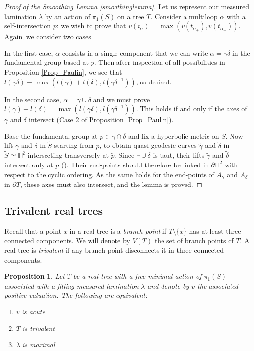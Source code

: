 \documentclass{amsart}
\newtheorem{proposition}{Proposition}
\renewcommand{\H}{\mathbb{H}}
\begin{document}
\begin{proof}[Proof of the Smoothing Lemma \ref{smoothinglemma}]
Let us represent our measured lamination $\lambda$ by an action of $\pi_1(S)$ on a tree $T$. Consider a multiloop $\alpha$ with a self-intersection $p$: we wish to prove that $v(t_\alpha)=\max(v(t_{\alpha_+}),v(t_{\alpha_-}))$. Again, we consider two cases.

In the first case, $\alpha$ consists in a single component that we can write $\alpha=\gamma\delta$ in the fundamental group based at $p$. Then after inspection of all possibilities in Proposition \ref{Prop_Paulin}, we see that $l(\gamma\delta)=\max(l(\gamma)+l(\delta),l(\gamma\delta^{-1}))$, as desired.

In the second case, $\alpha=\gamma\cup\delta$ and we must prove $l(\gamma)+l(\delta)=\max(l(\gamma\delta),l(\gamma\delta^{-1}))$. This holds if and only if the axes of $\gamma$ and $\delta$ intersect (Case 2 of Proposition \ref{Prop_Paulin}). 

Base the fundamental group at $p\in \gamma\cap \delta$ and fix a hyperbolic metric on $S$. Now lift $\gamma$ and $\delta$ in $\tilde{S}$ starting from $p$, to obtain quasi-geodesic curves $\tilde{\gamma}$ and $\tilde{\delta}$ in $\tilde{S}\simeq \H^2$ intersecting transversely at $\tilde{p}$.
%
Since $\gamma \cup \delta$ is taut, 
their lifts $\tilde{\gamma}$ and $\tilde{\delta}$ intersect only at $p$ (\cite[see Definition 8 to Lemma 10]{Dylan_Thurston_intersection_2009}). Their end-points should therefore be linked in $\partial\H^2$ with respect to the cyclic ordering. As the same holds for the end-points of $A_\gamma$ and $A_\delta$ in $\partial T$, these axes must also intersect, and the lemma is proved.
\end{proof}

\subsection{Trivalent real trees}
Recall that a point $x$ in a real tree is a \emph{branch point} if $T\setminus\{x\}$ has at least three connected components. We will denote by $V(T)$ the set of branch points of $T$. A real tree is \emph{trivalent} if any branch point disconnects it in three connected components.
\begin{proposition}\label{maxacutriv}
Let $T$ be a real tree with a free minimal action of $\pi_1(S)$ associated with a filling measured lamination $\lambda$ and denote by $v$ the associated positive valuation. 
The following are equivalent:
\begin{enumerate}
\item $v$ is acute
\item $T$ is trivalent
\item $\lambda$ is maximal 
\end{enumerate}
\end{proposition}
\end{document}
